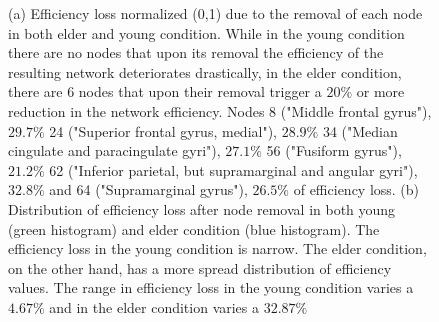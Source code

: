 \documentclass[12pt,a4paper]{article}
\begin{document}
\begin{figure}[!ht]
    \hfill
    \caption{\small (a) Efficiency loss normalized (0,1) due to the removal of each node in both elder and young condition. While in the young condition there are no nodes that upon its removal the efficiency of the resulting network deteriorates drastically, in the elder condition, there are 6 nodes that upon their removal trigger a $20\%$ or more reduction in the network efficiency. Nodes 8 ("Middle frontal gyrus"), $29.7\%$  24 ("Superior frontal gyrus, medial"), $28.9\%$   34 ("Median cingulate and paracingulate gyri"), $27.1\%$  56 ("Fusiform gyrus"),$21.2\%$  62 ("Inferior parietal, but supramarginal and angular gyri"), $32.8\%$  and 64 ("Supramarginal gyrus"), $26.5\%$ of efficiency loss.   
  \small (b) Distribution of efficiency loss after node removal in both young (green histogram) and elder condition (blue histogram). The efficiency loss in the young condition is narrow. The elder condition, on the other hand, has a more spread distribution of efficiency values. 
The range in efficiency loss in the young condition varies a $4.67\%$ and in the elder condition varies a $32.87\%$}
    \label{fig:gauss}
  \end{figure} 
\end{document}
